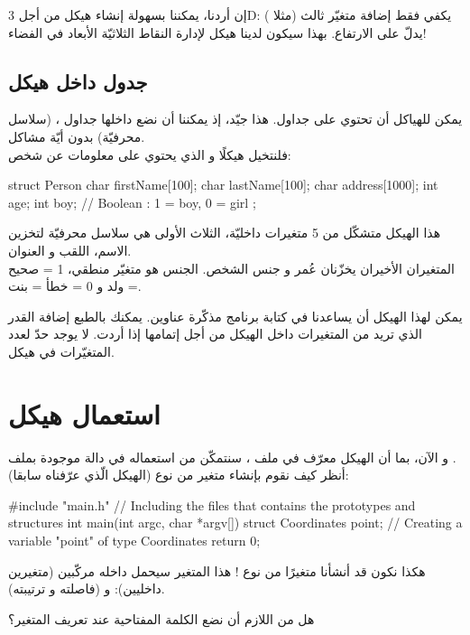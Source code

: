 إن أردنا، يمكننا بسهولة إنشاء هيكل
من أجل
\textenglish{3D}:
يكفي فقط إضافة متغيّر ثالث (مثلا
)
يدلّ على الارتفاع. بهذا سيكون لدينا هيكل لإدارة النقاط الثلاثيّة الأبعاد في الفضاء!

\subsection{جدول داخل هيكل}

يمكن للهياكل أن تحتوي على جداول. هذا جيّد، إذ يمكننا أن نضع داخلها جداول
،
(سلاسل محرفيّة) بدون أيّة مشاكل.\\
فلنتخيل هيكلًا
و الذي يحتوي على معلومات عن شخص:

\begin{Csource}
struct Person
{
	char firstName[100];
	char lastName[100];
	char address[1000];
	int age;
	int boy; // Boolean : 1 = boy, 0 = girl
};
\end{Csource}

هذا الهيكل متشكّل من 5 متغيرات داخليّة، الثلاث الأولى هي سلاسل محرفيّة لتخزين الاسم، اللقب و العنوان.\\
المتغيران الأخيران يخزّنان عُمر و جنس الشخص. الجنس هو متغيّر منطقي، 1 = صحيح = ولد و 0 = خطأ = بنت.

يمكن لهذا الهيكل أن يساعدنا في كتابة برنامج مذكّرة عناوين. يمكنك بالطبع إضافة القدر الذي تريد من المتغيرات داخل الهيكل من أجل إتمامها إذا أردت. لا يوجد حدّ لعدد المتغيّرات في هيكل.

\section{استعمال هيكل}

و الآن، بما أن الهيكل معرّف في ملف
،
سنتمكّن من استعماله في دالة موجودة بملف
.\\
أنظر كيف نقوم بإنشاء متغير من نوع
(الهيكل الّذي عرّفناه سابقا):
\begin{Csource}
#include "main.h" // Including the files that contains the prototypes and structures
int main(int argc, char *argv[])
{
	struct Coordinates point; // Creating a variable "point" of type Coordinates
	return 0;
}
\end{Csource}
هكذا نكون قد أنشأنا متغيرًا
من نوع
!
هذا المتغير سيحمل داخله مركّبين (متغيرين داخليين):
و
(فاصلته و ترتيبته).

\begin{question}
  هل من اللازم أن نضع الكلمة المفتاحية
عند تعريف المتغير؟
\end{question}

